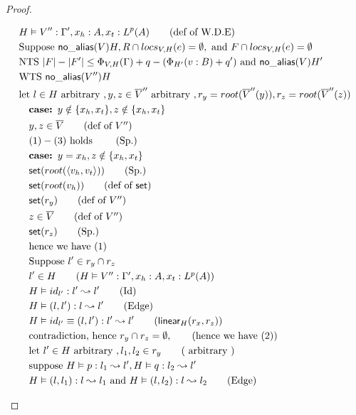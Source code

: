 \documentclass[11pt]{article}
\newcommand{\ms}[1]{\ensuremath{\mathsf{#1}}}
\newcommand{\na}[1]{\mathsf{no\_alias}(#1)}
\begin{document}
\begin{proof}
\begin{description}
\begin{align*}
  &H \vDash V'' : \Gamma', x_h : A, x_t : L^p(A) \tag{def of W.D.E}\\
  &\text{Suppose }  \na{V}{H}, R \cap locs_{V,H}(e) = \emptyset, \text{ and } F \cap locs_{V,H}(e) = \emptyset\\
  &\text{NTS }  |F| - |F'| \le \Phi_{V,H}(\Gamma) +q - (\Phi_{H'}(v:B) + q') \text{ and } \na{V}{H'}\\
  &\text{WTS } \na{V''}{H}\\
  &\text{let } l \in H \text{ arbitrary }, y, z \in \overline V'' \text{ arbitrary },  r_y = root(\overline V''(y)), r_z = root(\overline V''(z))\\
  &\quad\textbf{case: } y \notin \{x_h,x_t\}, z \notin \{x_h,x_t\}\\
  &\quad y,z \in \overline V \tag{def of $V''$}\\
  &\quad (1) - (3) \text{ holds } \tag{Sp.}\\
  &\quad\textbf{case: } y = x_h, z \notin \{x_h,x_t\}\\
  &\quad \ms{set}(root(\pairexcst{v_h}{v_t})) \tag{Sp.}\\
  &\quad \ms{set}(root(v_h)) \tag{def of $\ms{set}$}\\
  &\quad \ms{set}(r_y) \tag{def of $V''$}\\
  &\quad z \in \overline V \tag{def of $V''$}\\
  &\quad \ms{set}(r_z) \tag{Sp.}\\
  &\quad \text{hence we have (1)}\\
  &\quad \text{Suppose } l' \in r_y \cap r_z\\
  &\quad l' \in H \tag{$H \vDash V'' :  \Gamma', x_h : A, x_t : L^p(A)$}\\
  &\quad H \vDash id_{l'} : l' \leadsto l' \tag{Id}\\
  &\quad H \vDash (l,l') : l \leadsto l' \tag{Edge}\\
  &\quad H \vDash id_{l'} \equiv (l,l') : l' \leadsto l' \tag{$\ms{linear}_H(r_x,r_z)$}\\
  &\quad \text{contradiction, hence } r_y \cap r_z = \emptyset,  \tag{hence we have (2)}\\
  &\quad \text{let } l' \in H \text{ arbitrary }, l_1,l_2 \in r_y \tag{ arbitrary }\\
  &\quad \text{suppose } H \vDash p : l_1 \leadsto l', H \vDash q : l_2 \leadsto l'\\
  &\quad H \vDash (l,l_1) : l \leadsto l_1 \text{ and }  H \vDash (l,l_2) : l \leadsto l_2 \tag{Edge}\\

\end{align*}
\end{description}
\end{proof}
\end{document}

